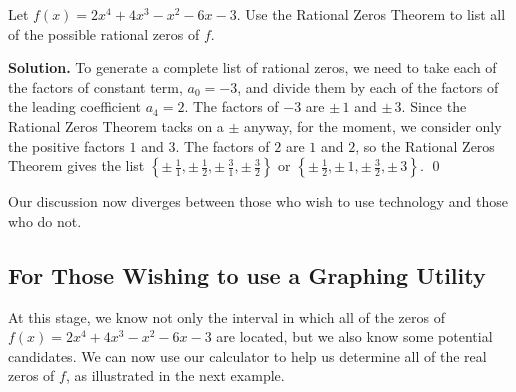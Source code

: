 \documentclass{ximera}
\begin{document}
\begin{example}  Let $f(x) = 2x^4+4x^3-x^2-6x-3$. Use the Rational Zeros Theorem to list all of the possible rational zeros of $f$.

\smallskip

{\bf Solution.}  To generate a complete list of rational zeros, we need to take each of the factors of constant term, $a_0 = -3$, and divide them by each of the factors of the leading coefficient $a_4 = 2$.  The factors of $-3$ are $\pm \, 1$ and $\pm \, 3$.  Since the Rational Zeros Theorem tacks on a $\pm$ anyway, for the moment, we consider only the positive factors $1$ and $3$.  The factors of $2$ are  $1$ and $2$, so the Rational Zeros Theorem gives the list $\left\{\pm \, \frac{1}{1}, \pm \, \frac{1}{2},  \pm \, \frac{3}{1}, \pm \, \frac{3}{2}\right\}$ or $\left\{\pm \, \frac{1}{2}, \pm \, 1, \pm \, \frac{3}{2}, \pm \, 3\right\}$. \qed
\label{RZTex}
\end{example}

Our discussion now diverges between those who wish to use technology and those who do not.  

\subsection{For Those Wishing to use a Graphing Utility}

At this stage, we know not only the interval in which all of the zeros of $f(x) = 2x^4+4x^3-x^2-6x-3$ are located, but we also know some potential candidates.  We can now use our calculator to help us determine all of the real zeros of $f$, as illustrated in the next example.
\end{document}
